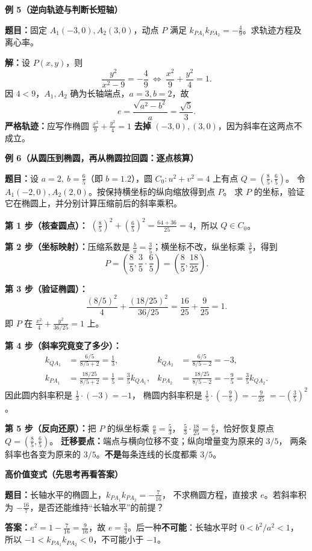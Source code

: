 \begin{examplebox}
\medskip
\textbf{\textcolor{CExample}{例 5（逆向轨迹与判断长短轴）}}
\par\textbf{题目：}固定 $A_1(-3,0),A_2(3,0)$，动点 $P$ 满足
$k_{PA_1}k_{PA_2}=-\frac49$。求轨迹方程及离心率。
\par\textbf{解：}设 $P(x,y)$，则
\[
 \frac{y^2}{x^2-9}=-\frac49
 \ \Longleftrightarrow\ \frac{x^2}{9}+\frac{y^2}{4}=1.
\]
因 $4<9$，$A_1,A_2$ 确为长轴端点，$a=3,b=2$，故
\[
 \boxed{e=\frac{\sqrt{a^2-b^2}}a=\frac{\sqrt5}{3}}.
\]
\textbf{严格轨迹：}应写作椭圆 $\frac{x^2}{9}+\frac{y^2}{4}=1$
\textbf{去掉} $(-3,0),(3,0)$，因为斜率在这两点不成立。

\medskip
\textbf{\textcolor{CExample}{例 6（从圆压到椭圆，再从椭圆拉回圆：逐点核算）}}
\par\textbf{题目：}设 $a=2,\ b=\frac65$（即 $b=1.2$），圆
$C_0:u^2+v^2=4$ 上有点 $Q=(\frac85,\frac65)$。
令 $A_1(-2,0),A_2(2,0)$。按保持横坐标的纵向缩放得到点 $P$。
求 $P$ 的坐标，验证它在椭圆上，并分别计算压缩前后的斜率乘积。
\par\textbf{第 1 步（核查圆点）：}
$\left(\frac85\right)^2+\left(\frac65\right)^2=\frac{64+36}{25}=4$，所以 $Q\in C_0$。
\par\textbf{第 2 步（坐标映射）：}压缩系数是 $\frac ba=\frac35$；横坐标不改，纵坐标乘 $\frac35$，得到
\[
 \boxed{P=\left(\frac85,\frac35\cdot\frac65\right)
 =\left(\frac85,\frac{18}{25}\right)}.
\]
\par\textbf{第 3 步（验证椭圆）：}
\[
 \frac{(8/5)^2}{4}+\frac{(18/25)^2}{36/25}
 =\frac{16}{25}+\frac9{25}=1.
\]
即 $P$ 在 $\frac{x^2}{4}+\frac{y^2}{36/25}=1$ 上。
\par\textbf{第 4 步（斜率究竟变了多少）：}
\[
 \begin{aligned}
  k_{QA_1}&=\frac{6/5}{8/5+2}=\frac13,&
  k_{QA_2}&=\frac{6/5}{8/5-2}=-3,\\
  k_{PA_1}&=\frac{18/25}{8/5+2}=\frac15=\frac35k_{QA_1},&
  k_{PA_2}&=\frac{18/25}{8/5-2}=-\frac95=\frac35k_{QA_2}.
 \end{aligned}
\]
因此圆内斜率积是 $\frac13\cdot(-3)=-1$，
椭圆内斜率积是 $\frac15\cdot(-\frac95)=\boxed{-\frac9{25}}$
$=-\left(\frac35\right)^2$。
\par\textbf{第 5 步（反向还原）：}把 $P$ 的纵坐标乘 $\frac ab=\frac53$，
$\frac53\cdot\frac{18}{25}=\frac65$，恰好恢复原点 $Q=(\frac85,\frac65)$。
\textbf{迁移要点：}端点与横向位移不变；纵向增量变为原来的 $3/5$，
两条斜率也各变为原来的 $3/5$。\textbf{不是}每条连线的长度都乘 $3/5$。

\medskip
\textbf{\textcolor{CExample}{高价值变式（先思考再看答案）}}
\par\textbf{题目：}长轴水平的椭圆上，$k_{PA_1}k_{PA_2}=-\frac{7}{16}$，
不求椭圆方程，直接求 $e$。若斜率积为 $-\frac{16}{7}$，是否还能维持“长轴水平”的前提？
\par\textbf{答案：}$e^2=1-\frac{7}{16}=\frac9{16}$，故
$\boxed{e=\frac34}$。后一种\textbf{不可能}：长轴水平时 $0<b^2/a^2<1$，
所以 $-1<k_{PA_1}k_{PA_2}<0$，不可能小于 $-1$。
\end{examplebox}
